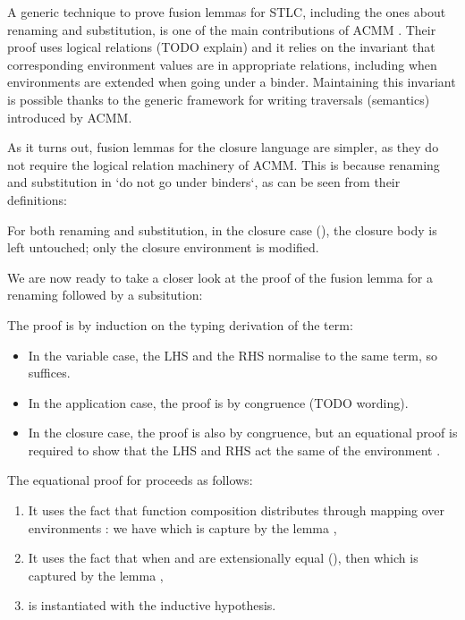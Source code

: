 \documentclass[bsc,frontabs,twoside,singlespacing,parskip,deptreport]{infthesis}
\theoremstyle{definition}
\begin{document}
A generic technique to prove fusion lemmas for STLC,
including the ones about renaming and substitution, is one of the main
contributions of ACMM \cite{DBLP:conf/cpp/Allais0MM17}. Their proof
uses logical relations (TODO explain) and it relies on the invariant
that corresponding environment values are in appropriate relations,
including when environments are extended when going under a
binder. Maintaining this invariant is possible thanks to the generic
framework for writing traversals (semantics) introduced by ACMM.

As it turns out, fusion lemmas for the closure language are simpler,
as they do not require the logical relation machinery of ACMM. This is
because renaming and substitution in \lcl `do not go under binders`,
as can be seen from their definitions:


For both renaming and substitution, in the closure case (), the
closure body is left untouched; only the closure environment is
modified.

We are now ready to take a closer look at the proof of the fusion
lemma for a renaming followed by a subsitution:


The proof is by induction on the typing derivation of the term:

\begin{itemize}
\item In the variable case, the LHS and the RHS normalise to the same
  term, so  suffices.
\item In the application case, the proof is by congruence (TODO
  wording).
\item In the closure case, the proof is also by congruence, but
  an equational proof is required to show that the LHS and RHS act the
  same of the environment .
\end{itemize}

The equational proof for  proceeds as follows:

\begin{enumerate}
\item It uses the fact that function composition 
  distributes through mapping over environments \AS{\_<\$>\_}: we have
   which is capture by the lemma
  ,
\item It uses the fact that when  and  are extensionally
  equal (), then  which
  is captured by the lemma ,
\item {} is instantiated with the inductive hypothesis.
\end{enumerate}
\end{document}
